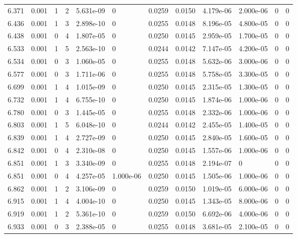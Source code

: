 \documentclass[preview]{standalone}
\begin{document}
{{{{{\begin{tabular}{L{1.2cm}C{1.2cm} C{0.3cm}C{0.5cm} C{1.4cm}C{1.4cm} C{1.4cm}C{1.4cm} C{1.6cm}C{1.6cm} C{1.6cm}C{1.6cm}}
  6.371  &  0.001  & 1     &  2 &  5.631e-09  & 0  &  0.0259&   0.0150& 4.179e-06 & 2.000e-06   &  0 & 0  \\ 
  6.436  &  0.001  & 1     &  3 &  2.898e-10  & 0  &  0.0255&   0.0148& 8.196e-05 & 4.800e-05   &  0 & 0  \\ 
  6.438  &  0.001  & 0     &  4 &  1.807e-05  & 0  &  0.0250&   0.0145& 2.959e-05 & 1.700e-05   &  0 & 0  \\ 
  6.533  &  0.001  & 1     &  5 &  2.563e-10  & 0  &  0.0244&   0.0142& 7.147e-05 & 4.200e-05   &  0 & 0  \\ 
  6.534  &  0.001  & 0     &  3 &  1.060e-05  & 0  &  0.0255&   0.0148& 5.632e-06 & 3.000e-06   &  0 & 0  \\ 
  6.577  &  0.001  & 0     &  3 &  1.711e-06  & 0  &  0.0255&   0.0148& 5.758e-05 & 3.300e-05   &  0 & 0  \\ 
  6.699  &  0.001  & 1     &  4 &  1.015e-09  & 0  &  0.0250&   0.0145& 2.315e-05 & 1.300e-05   &  0 & 0  \\ 
  6.732  &  0.001  & 1     &  4 &  6.755e-10  & 0  &  0.0250&   0.0145& 1.874e-06 & 1.000e-06   &  0 & 0  \\ 
  6.780  &  0.001  & 0     &  3 &  1.445e-05  & 0  &  0.0255&   0.0148& 2.332e-06 & 1.000e-06   &  0 & 0  \\ 
  6.803  &  0.001  & 1     &  5 &  6.048e-10  & 0  &  0.0244&   0.0142& 2.455e-05 & 1.400e-05   &  0 & 0  \\ 
  6.839  &  0.001  & 1     &  4 &  2.727e-09  & 0  &  0.0250&   0.0145& 2.840e-05 & 1.600e-05   &  0 & 0  \\ 
  6.842  &  0.001  & 0     &  4 &  2.310e-08  & 0  &  0.0250&   0.0145& 1.557e-06 & 1.000e-06   &  0 & 0  \\ 
  6.851  &  0.001  & 1     &  3 &  3.340e-09  & 0  &  0.0255&   0.0148& 2.194e-07 & 0   &  0 & 0  \\ 
  6.851  &  0.001  & 0     &  4 &  4.257e-05  & 1.000e-06  &  0.0250&   0.0145& 1.505e-06 & 1.000e-06   &  0 & 0  \\ 
  6.862  &  0.001  & 1     &  2 &  3.106e-09  & 0  &  0.0259&   0.0150& 1.019e-05 & 6.000e-06   &  0 & 0  \\ 
  6.915  &  0.001  & 1     &  4 &  4.004e-10  & 0  &  0.0250&   0.0145& 1.343e-05 & 8.000e-06   &  0 & 0  \\ 
  6.919  &  0.001  & 1     &  2 &  5.361e-10  & 0  &  0.0259&   0.0150& 6.692e-06 & 4.000e-06   &  0 & 0  \\ 
  6.933  &  0.001  & 0     &  3 &  2.388e-05  & 0  &  0.0255&   0.0148& 3.681e-05 & 2.100e-05   &  0 & 0  \\ 

\end{tabular}}}}}}
\end{document}

